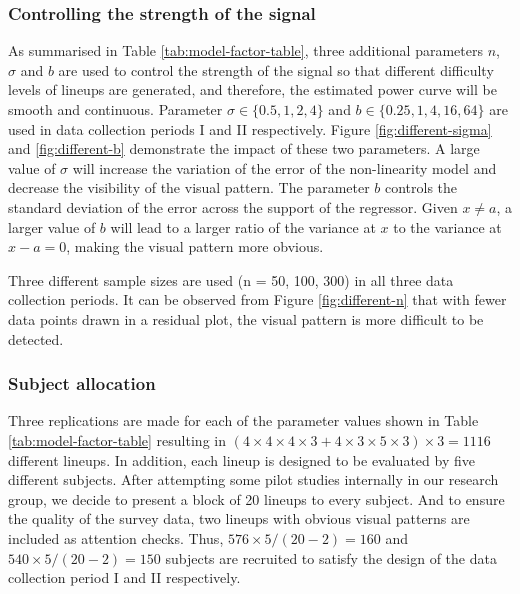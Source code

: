 \documentclass[]{interact}
\theoremstyle{plain}%
\theoremstyle{definition}
\theoremstyle{remark}
\begin{document}
\hypertarget{controlling-the-strength-of-the-signal}{%
\subsubsection{Controlling the strength of the
signal}\label{controlling-the-strength-of-the-signal}}

As summarised in Table \ref{tab:model-factor-table}, three additional
parameters \(n\), \(\sigma\) and \(b\) are used to control the strength
of the signal so that different difficulty levels of lineups are
generated, and therefore, the estimated power curve will be smooth and
continuous. Parameter \(\sigma \in \{0.5, 1, 2, 4\}\) and
\(b \in \{0.25, 1, 4, 16, 64\}\) are used in data collection periods I
and II respectively. Figure \ref{fig:different-sigma} and
\ref{fig:different-b} demonstrate the impact of these two parameters. A
large value of \(\sigma\) will increase the variation of the error of
the non-linearity model and decrease the visibility of the visual
pattern. The parameter \(b\) controls the standard deviation of the
error across the support of the regressor. Given \(x \neq a\), a larger
value of \(b\) will lead to a larger ratio of the variance at \(x\) to
the variance at \(x - a = 0\), making the visual pattern more obvious.

Three different sample sizes are used (n = 50, 100, 300) in all three
data collection periods. It can be observed from Figure
\ref{fig:different-n} that with fewer data points drawn in a residual
plot, the visual pattern is more difficult to be detected.

\hypertarget{subject-allocation}{%
\subsubsection{Subject allocation}\label{subject-allocation}}

Three replications are made for each of the parameter values shown in
Table \ref{tab:model-factor-table} resulting in
\((4 \times 4 \times 4 \times 3 + 4 \times 3 \times 5 \times 3) \times 3 = 1116\)
different lineups. In addition, each lineup is designed to be evaluated
by five different subjects. After attempting some pilot studies
internally in our research group, we decide to present a block of 20
lineups to every subject. And to ensure the quality of the survey data,
two lineups with obvious visual patterns are included as attention
checks. Thus, \(576 \times 5 / (20-2) = 160\) and
\(540 \times 5 / (20-2) = 150\) subjects are recruited to satisfy the
design of the data collection period I and II respectively.
\end{document}
